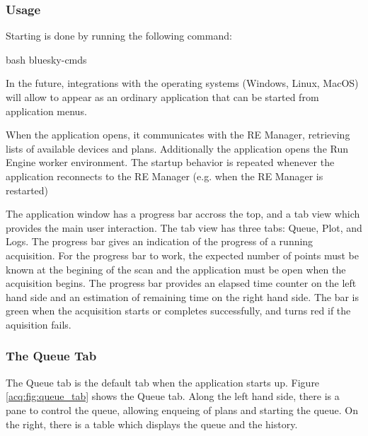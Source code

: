 \subsubsection{Usage}


Starting \blueskycmds is done by running the following command:

\begin{codefragment}{bash}
bluesky-cmds
\end{codefragment}

In the future, integrations with the operating systems (Windows, Linux, MacOS) will allow \blueskycmds to appear as an ordinary application that can be started from application menus.

When the application opens, it communicates with the RE Manager, retrieving lists of available devices and plans.
Additionally the application opens the Run Engine worker environment.
The startup behavior is repeated whenever the application reconnects to the RE Manager (e.g. when the RE Manager is restarted)

The application window has a progress bar accross the top, and a tab view which provides the main user interaction.
The tab view has three tabs: Queue, Plot, and Logs.
The progress bar gives an indication of the progress of a running acquisition.
For the progress bar to work, the expected number of points must be known at the begining of the scan and the application must be open when the acquisition begins.
The progress bar provides an elapsed time counter on the left hand side and an estimation of remaining time on the right hand side.
The bar is green when the acquisition starts or completes successfully, and turns red if the aquisition fails.

\subsubsection{The Queue Tab}

The Queue tab is the default tab when the application starts up.
Figure \ref{acq:fig:queue_tab} shows the Queue tab.
Along the left hand side, there is a pane to control the queue, allowing enqueing of plans and starting the queue.
On the right, there is a table which displays the queue and the history.

